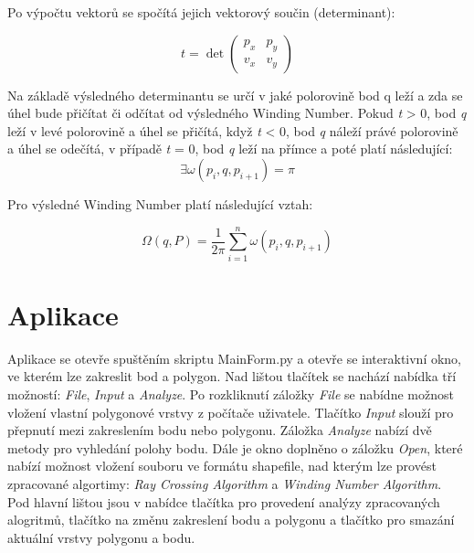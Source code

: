 \documentclass[12pt, a4paper]{article}
\begin{document}
\noindent Po výpočtu vektorů se spočítá jejich vektorový součin (determinant):
\vspace{1cm}

\[
t = \det \begin{pmatrix} p_x & p_y \\ v_x & v_y \end{pmatrix}
\]
\vspace{1cm}

\noindent Na základě výsledného determinantu se určí v jaké polorovině bod q leží a zda se úhel bude přičítat či odčítat od výsledného Winding Number. Pokud \textit{t} > 0, bod \textit{q} leží v levé polorovině a úhel se přičítá, když \textit{t} < 0, bod \textit{q} náleží právé polorovině a úhel se odečítá, v případě \textit{t} = 0, bod \textit{q} leží na přímce a poté platí následující:
\vspace{1cm}
\[
\exists \omega(p_i, q, p_{i+1}) = \pi
\]
\vspace{1cm}

\noindent Pro výsledné Winding Number platí následující vztah:
\vspace{1cm}

\[
\Omega(q, P) = \frac{1}{2\pi} \sum_{i=1}^{n} \omega(p_i, q, p_{i+1})
\]
\vspace{1cm}




\newpage
\section {Aplikace}
\vspace{5mm}
Aplikace se otevře spuštěním skriptu MainForm.py a otevře se interaktivní okno, ve kterém lze zakreslit bod a polygon. Nad lištou tlačítek se nachází nabídka tří možností: \textit {File}, \textit {Input} a \textit {Analyze}. Po rozkliknutí záložky \textit {File} se nabídne možnost vložení vlastní polygonové vrstvy z počítače uživatele. Tlačítko \textit {Input} slouží pro přepnutí mezi zakreslením bodu nebo polygonu. Záložka \textit {Analyze}  nabízí dvě metody pro vyhledání polohy bodu. Dále je okno doplněno o záložku \textit {Open}, které nabízí možnost vložení souboru ve formátu shapefile, nad kterým lze provést zpracované algortimy: \textit {Ray Crossing Algorithm} a \textit {Winding Number Algorithm}. Pod hlavní lištou jsou v nabídce tlačítka pro provedení analýzy zpracovaných alogritmů, tlačítko na změnu zakreslení bodu a polygonu a tlačítko pro smazání aktuální vrstvy polygonu a bodu.
\vspace{3mm}
\end{document}
